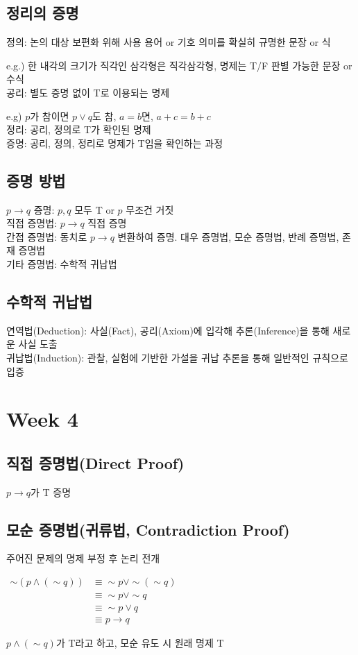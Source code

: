 \subsection{정리의 증명}
정의: 논의 대상 보편화 위해 사용 용어 or 기호 의미를 확실히 규명한 문장 or 식

e.g.) 한 내각의 크기가 직각인 삼각형은 직각삼각형, 명제는 T/F 판별 가능한 문장 or 수식\\
공리: 별도 증명 없이 T로 이용되는 명제

e.g) $p$가 참이면 $p\lor q$도 참, $a=b$면, $a+c=b+c$\\
정리: 공리, 정의로 T가 확인된 명제\\
증명: 공리, 정의, 정리로 명제가 T임을 확인하는 과정

\subsection{증명 방법}
$p\to q$ 증명: $p, q$ 모두 T or $p$ 무조건 거짓\\
직접 증명법: $p\to q$ 직접 증명\\
간접 증명법: 동치로 $p \to q$ 변환하여 증명. 대우 증명법, 모순 증명법, 반례 증명법, 존재 증명법\\
기타 증명법: 수학적 귀납법

\subsection{수학적 귀납법}
연역법(Deduction): 사실(Fact), 공리(Axiom)에 입각해 추론(Inference)을 통해 새로운 사실 도출\\
귀납법(Induction): 관찰, 실험에 기반한 가설을 귀납 추론을 통해 일반적인 규칙으로 입증

\section{Week 4}
\subsection{직접 증명법(Direct Proof)}
$p \to q$가 T 증명

\subsection{모순 증명법(귀류법, Contradiction Proof)}
주어진 문제의 명제 부정 후 논리 전개\\
\begin{flushleft}
    $\begin{aligned}
        \sim (p \land (\sim q)) &\equiv \sim p \lor \sim(\sim q)\\
        &\equiv \sim p \lor \sim q\\
        &\equiv \sim p \lor q\\
        &\equiv p \to q
    \end{aligned}$
\end{flushleft}$$$$
$p \land (\sim q)$가 T라고 하고, 모순 유도 시 원래 명제 T

